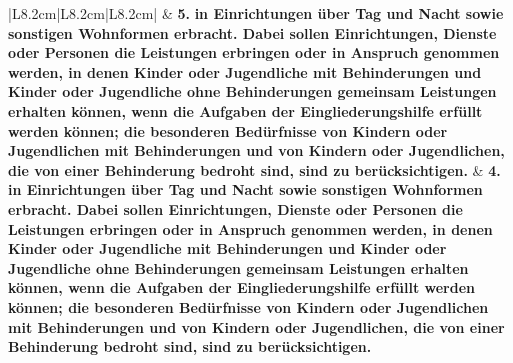 \documentclass[10pt,a4paper,landscape]{article}
\begin{document}
\begin{longtable}{|L{8.2cm}|L{8.2cm}|L{8.2cm}|}
 & \textbf{\textcolor{diffred}{5.}}\textbf{ in Einrichtungen über Tag und Nacht  \newline sowie sonstigen Wohnformen erbracht.  \newline Dabei sollen Einrichtungen, Dienste  \newline oder Personen die Leistungen erbringen  \newline oder in Anspruch genommen werden, in  \newline denen Kinder oder Jugendliche mit  \newline Behinderungen und Kinder oder  \newline Jugendliche ohne Behinderungen  \newline gemeinsam Leistungen erhalten  \newline können, wenn die Aufgaben der  \newline Eingliederungshilfe erfüllt werden  \newline können; die besonderen Bedürfnisse  \newline von Kindern oder Jugendlichen mit  \newline Behinderungen und von Kindern oder  \newline Jugendlichen, die von einer  \newline Behinderung bedroht sind, sind zu  \newline berücksichtigen. } & \textbf{\textcolor{diffgreen}{4.}}\textbf{ in Einrichtungen über Tag und Nacht  \newline sowie sonstigen Wohnformen erbracht.   \newline Dabei sollen Einrichtungen, Dienste  \newline oder Personen die Leistungen erbringen  \newline oder in Anspruch genommen werden, in  \newline denen Kinder oder Jugendliche mit  \newline Behinderungen und Kinder oder  \newline Jugendliche ohne Behinderungen  \newline gemeinsam Leistungen erhalten  \newline können, wenn die Aufgaben der  \newline Eingliederungshilfe erfüllt werden  \newline können; die besonderen Bedürfnisse  \newline von Kindern oder Jugendlichen mit  \newline Behinderungen und von Kindern oder  \newline Jugendlichen, die von einer  \newline Behinderung bedroht sind, sind zu  \newline berücksichtigen. } \\

\end{longtable}
\end{document}
